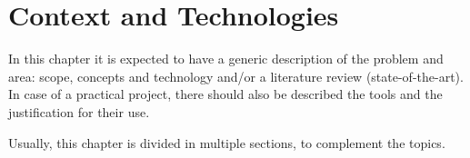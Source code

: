\chapter{Context and Technologies}\label{cap:conceptual}

In this chapter it is expected to have a generic description of the problem and area: scope, concepts and technology and/or a literature review (state-of-the-art). In case of a practical project, there should also be described the tools and the justification for their use.

Usually, this chapter is divided in multiple sections, to complement the topics.
